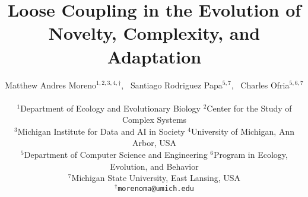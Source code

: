 
\title{
    Loose Coupling in the Evolution of Novelty, Complexity, and Adaptation
}
\author{
    Matthew Andres Moreno$^{1,2,3,4,\dagger}$,\ %
    Santiago Rodriguez Papa$^{5,7}$,\ %
    Charles Ofria$^{5,6,7}$ \\
    \mbox{}\\
    $^1$Department of Ecology and Evolutionary Biology
    $^2$Center for the Study of Complex Systems \\
    $^3$Michigan Institute for Data and AI in Society
    $^4$University of Michigan, Ann Arbor, USA \\
    $^5$Department of Computer Science and Engineering
    $^6$Program in Ecology, Evolution, and Behavior \\
    $^7$Michigan State University, East Lansing, USA \\
    $^\dagger$\texttt{morenoma@umich.edu}
}

\maketitle

%
%

